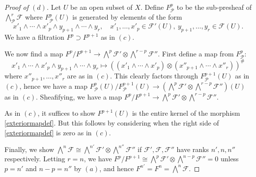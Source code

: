 \documentclass[12pt,letterpaper]{article}
\theoremstyle{definition}
\theoremstyle{remark}
\numberwithin{equation}{section}
\numberwithin{figure}{problem}
\newcommand{\FF}{\mathscr{F}}
\newcommand{\PP}{\mathcal{P}}
\begin{document}
\begin{proof}[Proof of $(d)$]
  Let $U$ be an open subset of $X$. Define $F^p_{\PP}$ to be the sub-presheaf of $\bigwedge^r_\PP \FF$ where $F^p_\PP(U)$ is generated by elements of the form
  \begin{equation*}
    x'_1 \wedge \cdots \wedge x'_p \wedge y_{p+1} \wedge \cdots \wedge y_r, \quad x'_1,\ldots,x'_p \in \FF'(U),~y_{p+1},\ldots,y_r \in \FF(U).
  \end{equation*}
  We have a filtration $F^p \supset F^{p+1}$ as in $(c)$.
  \par We now find a map $F^p/F^{p+1} \to \bigwedge^p \FF' \otimes \bigwedge^{r-p}\FF''$. First define a map from $F^p_\PP$:
  \begin{equation}\label{exteriormapdef}
    x'_1 \wedge \cdots \wedge x'_p \wedge y_{p+1} \wedge \cdots \wedge y_r \mapsto \left((x'_1 \wedge \cdots \wedge x'_p) \otimes (x''_{p+1} \wedge \cdots \wedge x''_r)\right)^\#
  \end{equation}
  where $x''_{p+1},\ldots,x''_r$ are as in $(c)$. This clearly factors through $F_\PP^{p+1}(U)$ as in $(c)$, hence we have a map $F^p_\PP(U)/F^{p+1}_\PP(U) \to \left(\bigwedge^p \FF' \otimes \bigwedge^{r-p}\FF''\right)(U)$ as in $(c)$. Sheafifying, we have a map $F^p/F^{p+1} \to \bigwedge^p \FF' \otimes \bigwedge^{r-p}\FF''$.
  \par As in $(c)$, it suffices to show $F^{p+1}(U)$ is the entire kernel of the morphism \eqref{exteriormapdef}. But this follows by considering when the right side of \eqref{exteriormapdef} is zero as in $(c)$.
  \par Finally, we show $\bigwedge^n\FF \cong \bigwedge^{n'}\FF' \otimes \bigwedge^{n''}\FF''$ if $\FF',\FF,\FF''$ have ranks $n',n,n''$ respectively. Letting $r = n$, we have $F^p/F^{p+1} \cong \bigwedge^p\FF' \otimes \bigwedge^{n-p} \FF'' = 0$ unless $p = n'$ and $n-p = n''$ by $(a)$, and hence $F^{n'} = F^n = \bigwedge^n\FF$.
\end{proof}
\end{document}
